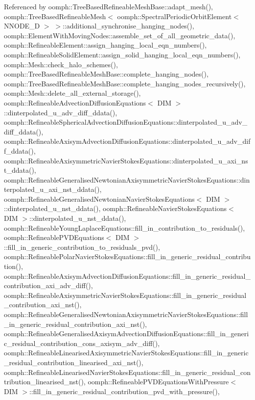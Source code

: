 Referenced by oomph\+::\+Tree\+Based\+Refineable\+Mesh\+Base\+::adapt\+\_\+mesh(), oomph\+::\+Tree\+Based\+Refineable\+Mesh$<$ oomph\+::\+Spectral\+Periodic\+Orbit\+Element$<$ N\+N\+O\+D\+E\+\_\+D $>$ $>$\+::additional\+\_\+synchronise\+\_\+hanging\+\_\+nodes(), oomph\+::\+Element\+With\+Moving\+Nodes\+::assemble\+\_\+set\+\_\+of\+\_\+all\+\_\+geometric\+\_\+data(), oomph\+::\+Refineable\+Element\+::assign\+\_\+hanging\+\_\+local\+\_\+eqn\+\_\+numbers(), oomph\+::\+Refineable\+Solid\+Element\+::assign\+\_\+solid\+\_\+hanging\+\_\+local\+\_\+eqn\+\_\+numbers(), oomph\+::\+Mesh\+::check\+\_\+halo\+\_\+schemes(), oomph\+::\+Tree\+Based\+Refineable\+Mesh\+Base\+::complete\+\_\+hanging\+\_\+nodes(), oomph\+::\+Tree\+Based\+Refineable\+Mesh\+Base\+::complete\+\_\+hanging\+\_\+nodes\+\_\+recursively(), oomph\+::\+Mesh\+::delete\+\_\+all\+\_\+external\+\_\+storage(), oomph\+::\+Refineable\+Advection\+Diffusion\+Equations$<$ D\+I\+M $>$\+::dinterpolated\+\_\+u\+\_\+adv\+\_\+diff\+\_\+ddata(), oomph\+::\+Refineable\+Spherical\+Advection\+Diffusion\+Equations\+::dinterpolated\+\_\+u\+\_\+adv\+\_\+diff\+\_\+ddata(), oomph\+::\+Refineable\+Axisym\+Advection\+Diffusion\+Equations\+::dinterpolated\+\_\+u\+\_\+adv\+\_\+diff\+\_\+ddata(), oomph\+::\+Refineable\+Axisymmetric\+Navier\+Stokes\+Equations\+::dinterpolated\+\_\+u\+\_\+axi\+\_\+nst\+\_\+ddata(), oomph\+::\+Refineable\+Generalised\+Newtonian\+Axisymmetric\+Navier\+Stokes\+Equations\+::dinterpolated\+\_\+u\+\_\+axi\+\_\+nst\+\_\+ddata(), oomph\+::\+Refineable\+Generalised\+Newtonian\+Navier\+Stokes\+Equations$<$ D\+I\+M $>$\+::dinterpolated\+\_\+u\+\_\+nst\+\_\+ddata(), oomph\+::\+Refineable\+Navier\+Stokes\+Equations$<$ D\+I\+M $>$\+::dinterpolated\+\_\+u\+\_\+nst\+\_\+ddata(), oomph\+::\+Refineable\+Young\+Laplace\+Equations\+::fill\+\_\+in\+\_\+contribution\+\_\+to\+\_\+residuals(), oomph\+::\+Refineable\+P\+V\+D\+Equations$<$ D\+I\+M $>$\+::fill\+\_\+in\+\_\+generic\+\_\+contribution\+\_\+to\+\_\+residuals\+\_\+pvd(), oomph\+::\+Refineable\+Polar\+Navier\+Stokes\+Equations\+::fill\+\_\+in\+\_\+generic\+\_\+residual\+\_\+contribution(), oomph\+::\+Refineable\+Axisym\+Advection\+Diffusion\+Equations\+::fill\+\_\+in\+\_\+generic\+\_\+residual\+\_\+contribution\+\_\+axi\+\_\+adv\+\_\+diff(), oomph\+::\+Refineable\+Axisymmetric\+Navier\+Stokes\+Equations\+::fill\+\_\+in\+\_\+generic\+\_\+residual\+\_\+contribution\+\_\+axi\+\_\+nst(), oomph\+::\+Refineable\+Generalised\+Newtonian\+Axisymmetric\+Navier\+Stokes\+Equations\+::fill\+\_\+in\+\_\+generic\+\_\+residual\+\_\+contribution\+\_\+axi\+\_\+nst(), oomph\+::\+Refineable\+Generalised\+Axisym\+Advection\+Diffusion\+Equations\+::fill\+\_\+in\+\_\+generic\+\_\+residual\+\_\+contribution\+\_\+cons\+\_\+axisym\+\_\+adv\+\_\+diff(), oomph\+::\+Refineable\+Linearised\+Axisymmetric\+Navier\+Stokes\+Equations\+::fill\+\_\+in\+\_\+generic\+\_\+residual\+\_\+contribution\+\_\+linearised\+\_\+axi\+\_\+nst(), oomph\+::\+Refineable\+Linearised\+Navier\+Stokes\+Equations\+::fill\+\_\+in\+\_\+generic\+\_\+residual\+\_\+contribution\+\_\+linearised\+\_\+nst(), oomph\+::\+Refineable\+P\+V\+D\+Equations\+With\+Pressure$<$ D\+I\+M $>$\+::fill\+\_\+in\+\_\+generic\+\_\+residual\+\_\+contribution\+\_\+pvd\+\_\+with\+\_\+pressure(), 